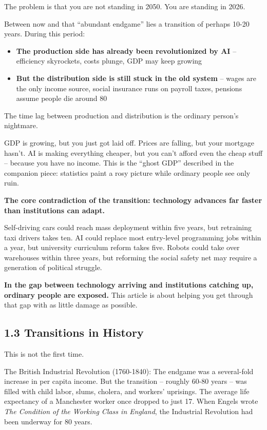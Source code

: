 The problem is that you are not standing in 2050. You are standing in
2026.

Between now and that ``abundant endgame'' lies a transition of perhaps
10-20 years. During this period:

\begin{itemize}
\tightlist
\item
  \textbf{The production side has already been revolutionized by AI} --
  efficiency skyrockets, costs plunge, GDP may keep growing
\item
  \textbf{But the distribution side is still stuck in the old system} --
  wages are the only income source, social insurance runs on payroll
  taxes, pensions assume people die around 80
\end{itemize}

The time lag between production and distribution is the ordinary
person's nightmare.

GDP is growing, but you just got laid off. Prices are falling, but your
mortgage hasn't. AI is making everything cheaper, but you can't afford
even the cheap stuff -- because you have no income. This is the ``ghost
GDP'' described in the companion piece: statistics paint a rosy picture
while ordinary people see only ruin.

\textbf{The core contradiction of the transition: technology advances
far faster than institutions can adapt.}

Self-driving cars could reach mass deployment within five years, but
retraining taxi drivers takes ten. AI could replace most entry-level
programming jobs within a year, but university curriculum reform takes
five. Robots could take over warehouses within three years, but
reforming the social safety net may require a generation of political
struggle.

\textbf{In the gap between technology arriving and institutions catching
up, ordinary people are exposed.} This article is about helping you get
through that gap with as little damage as possible.

\subsection{1.3 Transitions in History}\label{transitions-in-history}

This is not the first time.

The British Industrial Revolution (1760-1840): The endgame was a
several-fold increase in per capita income. But the transition --
roughly 60-80 years -- was filled with child labor, slums, cholera, and
workers' uprisings. The average life expectancy of a Manchester worker
once dropped to just 17. When Engels wrote \emph{The Condition of the
Working Class in England}, the Industrial Revolution had been underway
for 80 years.

